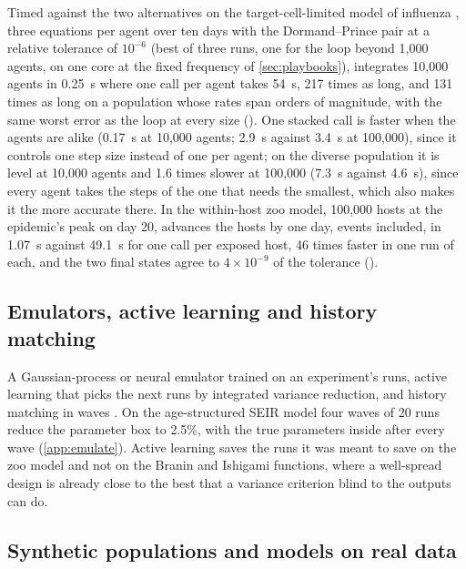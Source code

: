 Timed against the two alternatives on the target-cell-limited model of influenza
\citep{baccam2006kinetics}, three equations per agent over ten days with the Dormand--Prince
pair at a relative tolerance of $10^{-6}$ (best of three runs, one for the loop beyond 1,000 agents, on one core at the fixed
frequency of \cref{sec:playbooks}),  integrates 10,000 agents in 0.25~s where one
 call per agent takes 54~s, 217 times as long, and 131 times as long on a
population whose rates span orders of magnitude, with the same worst error as the loop at every size
(). One stacked  call is faster when the
agents are alike (0.17~s at 10,000 agents; 2.9~s against 3.4~s at 100,000), since it controls
one step size instead of one per agent; on the diverse population it is level at 10,000 agents
and 1.6 times slower at 100,000 (7.3~s against 4.6~s), since every agent takes the steps of the
one that needs the smallest, which also makes it the more accurate there. In the within-host
zoo model, 100,000 hosts at the epidemic's peak on day 20,  advances the hosts
by one day, events included, in 1.07~s against 49.1~s for one  call per
exposed host, 46 times faster in one run of each, and the two final states agree to
$4 \times 10^{-9}$ of the tolerance ().

\subsection{Emulators, active learning and history matching}
\label{sec:emulate}

A Gaussian-process or neural emulator trained on an experiment's runs, active learning that
picks the next runs by integrated variance reduction, and history matching in waves
\citep{vernon2010galaxy, andrianakis2015bayesian}. On the age-structured SEIR model four waves
of 20 runs reduce the parameter box to 2.5\%, with the true parameters inside after every wave
(\cref{app:emulate}). Active learning saves the runs it was meant to save on the zoo model and
not on the Branin and Ishigami functions, where a well-spread design is already close to the
best that a variance criterion blind to the outputs can do.

\subsection{Synthetic populations and models on real data}
\label{sec:population}

